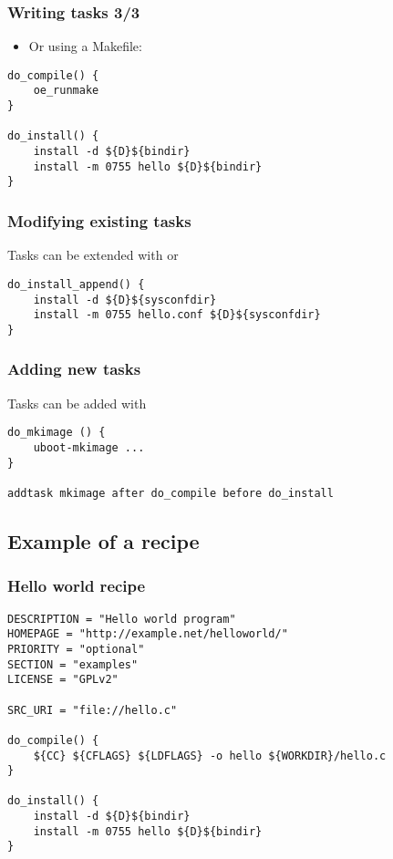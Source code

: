 \begin{frame}[fragile]
  \frametitle{Writing tasks 3/3}
  \begin{itemize}
    \item Or using a Makefile:
  \end{itemize}
  \begin{block}{}
    \begin{verbatim}
do_compile() {
    oe_runmake
}

do_install() {
    install -d ${D}${bindir}
    install -m 0755 hello ${D}${bindir}
}
    \end{verbatim}
  \end{block}
\end{frame}

\begin{frame}[fragile]
  \frametitle{Modifying existing tasks}
  Tasks can be extended with  or 
  \begin{block}{}
    \begin{verbatim}
do_install_append() {
    install -d ${D}${sysconfdir}
    install -m 0755 hello.conf ${D}${sysconfdir}
}
    \end{verbatim}
  \end{block}
\end{frame}

\begin{frame}[fragile]
  \frametitle{Adding new tasks}
  Tasks can be added with 
  \begin{block}{}
    \begin{verbatim}
do_mkimage () {
    uboot-mkimage ...
}

addtask mkimage after do_compile before do_install
    \end{verbatim}
  \end{block}
\end{frame}

\subsection{Example of a recipe}

\begin{frame}[fragile]
  \frametitle{Hello world recipe}
  \begin{block}{}
    \begin{verbatim}
DESCRIPTION = "Hello world program"
HOMEPAGE = "http://example.net/helloworld/"
PRIORITY = "optional"
SECTION = "examples"
LICENSE = "GPLv2"

SRC_URI = "file://hello.c"

do_compile() {
    ${CC} ${CFLAGS} ${LDFLAGS} -o hello ${WORKDIR}/hello.c
}

do_install() {
    install -d ${D}${bindir}
    install -m 0755 hello ${D}${bindir}
}
    \end{verbatim}
  \end{block}
\end{frame}

